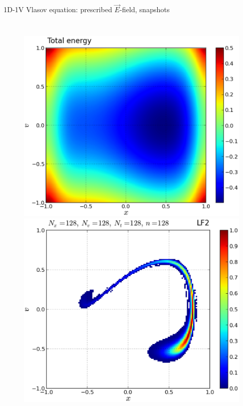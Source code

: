 \documentclass{beamer}
\begin{document}
\begin{frame}{1D-1V Vlasov equation: prescribed $\vec{E}$-field, snapshots}

\vspace*{-5.5mm}
\begin{columns}
\begin{figure}
\centering
 \includegraphics[width=\textwidth]{graphics/W_tot}\\ \vspace*{-4mm}
 \includegraphics[width=\textwidth]{graphics/plot_-_1DVP_F12_Nx128Nv128Nt128_it00128}

\end{figure}
\end{columns}
\end{frame}
\end{document}
